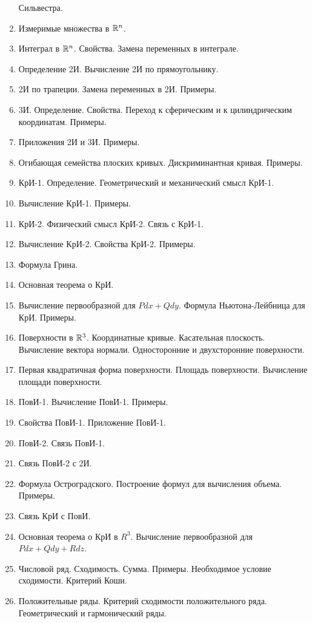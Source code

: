 \documentclass[../main.tex]{subfiles}
\begin{document}
\begin{enumerate}
  Сильвестра.
  \item Измеримые множества в $\mathbb{R}^n$.
  \item Интеграл в $\mathbb{R}^n$. Свойства. Замена переменных в интеграле.
  \item Определение 2И.  Вычисление 2И по прямоугольнику.
  \item 2И по трапеции. Замена переменных в 2И. Примеры.
  \item 3И. Определение. Свойства. Переход к сферическим и к цилиндрическим 
  координатам. Примеры.
  \item Приложения 2И и 3И. Примеры.
  \item Огибающая семейства плоских кривых. Дискриминантная кривая. Примеры.
  \item КрИ-1. Определение. Геометрический и механический смысл КрИ-1.
  \item Вычисление КрИ-1. Примеры.
  \item КрИ-2. Физический смысл КрИ-2. Связь с КрИ-1.
  \item Вычисление КрИ-2. Свойства КрИ-2. Примеры.
  \item Формула Грина.
  \item Основная теорема о КрИ.
  \item Вычисление первообразной для $Pdx+Qdy$. Формула Ньютона-Лейбница для 
  КрИ. Примеры.
  \item Поверхности в $\mathbb{R}^3$. Координатные кривые. Касательная плоскость. 
  Вычисление вектора нормали. Односторонние и двухсторонние поверхности.
  \item Первая квадратичная форма поверхности. Площадь поверхности. Вычисление 
  площади поверхности.
  \item ПовИ-1. Вычисление ПовИ-1. Примеры.
  \item Свойства ПовИ-1. Приложение ПовИ-1.
  \item ПовИ-2. Связь ПовИ-1.
  \item Связь ПовИ-2 с 2И.
  \item Формула Остроградского. Построение формул для вычисления объема. 
  Примеры.
  \item Связь КрИ с ПовИ.
  \item Основная теорема о КрИ в $R^3$. Вычисление первообразной для 
  $Pdx+Qdy+Rdz$.
  \item Числовой ряд. Сходимость. Сумма. Примеры. Необходимое условие 
  сходимости. Критерий Коши.
  \item Положительные ряды. Критерий сходимости положительного ряда. 
  Геометрический и гармонический ряды.

\end{enumerate}
\end{document}
